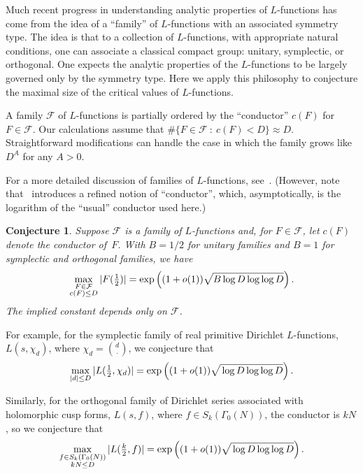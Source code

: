 \documentclass[10pt,reqno,twoside]{amsart}
\newtheorem{conj}{Conjecture}
\numberwithin{equation}{section}
\numberwithin{theorem}{section}
\begin{document}
Much recent progress in understanding analytic properties of
$L$-functions has come from the idea of a ``family'' of
$L$-functions with an associated symmetry type.
The idea is that to a collection of $L$-functions, with
appropriate natural conditions, one can associate a
classical compact group: unitary, symplectic, or orthogonal.
One expects the analytic properties of the $L$-functions
to be largely governed only by the symmetry type.
Here we apply this philosophy to conjecture the maximal size
of the critical values of $L$-functions.

A family $\mathcal F$ of $L$-functions is partially ordered by the
``conductor'' $c(F)$ for $F\in \mathcal F$.  Our calculations
assume that $\#\{F\in \mathcal F \ :\ c(F)<D\} \approx D$.
Straightforward modifications can handle the case in which the
family grows like $D^A$ for any $A>0$.

For a more detailed discussion of families of $L$-functions,
see~\cite{CF, CFKRS}.  (However, note that~\cite{CFKRS} introduces
a refined notion of ``conductor'',  which, asymptotically, is
the logarithm of the ``usual'' conductor  used here.)

\begin{conj}\label{conj:max value L}
Suppose $\mathcal F$ is a family of $L$-functions  and, for $F\in
\mathcal F$, let $c(F)$ denote the conductor of~$F$. With $B=1/2$
for unitary families and $B=1$ for symplectic and orthogonal
families, we have
\begin{equation}
\max_{\substack{F\in \mathcal F \\ c(F) \le D}} |F(\tfrac12)| =
\exp\left((1+o(1)) \sqrt{\mathstrut B \log D \log\log D }  \right)
.
\end{equation}
The implied constant depends only on $\mathcal F$.
\end{conj}

For example, for the symplectic family of real primitive
Dirichlet $L$-functions, $L(s,\chi_d)$, where $\chi_d=\binom{d}{\cdot}$,
we conjecture that
\begin{equation}
\max_{|d| \le D} |L(\tfrac12 ,\chi_d)| =
\exp\left(
      (1+o(1))  \sqrt{\mathstrut \log D \log\log D } \right) .
\end{equation}

Similarly, for the orthogonal family of Dirichlet series
associated with holomorphic cusp forms, $L(s,f)$, where $f\in
S_k(\Gamma_0(N))$, the conductor is $kN$, so we conjecture that
\begin{equation}
\max_{\substack{f\in S_k(\Gamma_0(N)) \\ kN \le D}} |L(\tfrac{k}2 ,f)| =
\exp\left(
      (1+o(1)) \sqrt{\mathstrut \log  D  \log\log  D  }  \right).
\end{equation}
\end{document}
